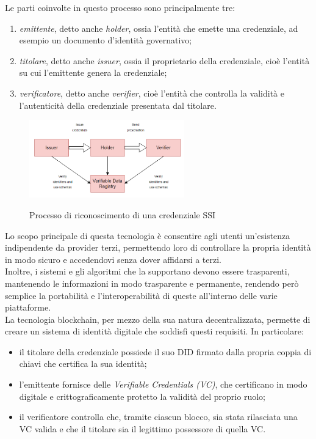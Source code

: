 Le parti coinvolte in questo processo sono principalmente tre:
\begin{enumerate}
    \item {\textit{emittente}, detto anche \textit{holder}}, ossia l'entità che emette una credenziale, ad esempio un documento d'identità governativo;
    \item {\textit{titolare}, detto anche \textit{issuer}}, ossia il proprietario della credenziale, cioè l'entità su cui l'emittente genera la credenziale;
    \item {\textit{verificatore}, detto anche \textit{verifier}}, cioè l'entità che controlla la validità e l'autenticità della credenziale presentata dal titolare.
\end{enumerate}  

\begin{figure}[h]
    \centering
    \includegraphics[width=0.6\textwidth, alt={Come funziona il riconoscimento nella SSI}]{immagini/ssi.png}
    \caption{Processo di riconoscimento di una credenziale SSI}
\end{figure}

Lo scopo principale di questa tecnologia è consentire agli utenti un'esistenza indipendente da provider terzi, 
permettendo loro di controllare la propria identità in modo sicuro e accedendovi senza dover affidarsi a terzi. \\
Inoltre, i sistemi e gli algoritmi che la supportano devono essere trasparenti, mantenendo le informazioni in modo trasparente e permanente, rendendo però semplice 
la portabilità e l'interoperabilità di queste all'interno delle varie piattaforme. \\

La tecnologia blockchain, per mezzo della sua natura decentralizzata, permette di creare un sistema di identità digitale che soddisfi questi requisiti.
In particolare:
\begin{itemize}
    \item il titolare della credenziale possiede il suo DID firmato dalla propria coppia di chiavi che certifica la sua identità;
    \item l'emittente fornisce delle \textit{Verifiable Credentials (VC)}, che certificano in modo digitale e crittograficamente protetto la validità del proprio ruolo;
    \item il verificatore controlla che, tramite ciascun blocco, sia stata rilasciata una VC valida e che il titolare sia il legittimo possessore di quella VC.
\end{itemize}  

